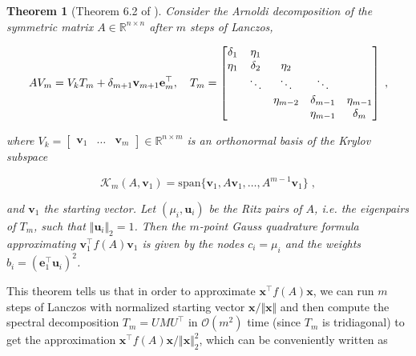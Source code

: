 \documentclass{article}
\newcommand{\vect}[1]{\boldsymbol{\mathbf{#1}}}
\newcommand{\R}{\mathbb R}
\newcommand{\norm}[1]{\Vert #1 \Vert}
\newtheorem{theorem}{Theorem}[section]
\begin{document}
\begin{theorem}[{{Theorem 6.2 of \cite{golub_matrices_2010}}}] \label{thm:lanczos_quadrature}
Consider the Arnoldi decomposition of the symmetric matrix $A \in \R^{n\times n}$ after $m$ steps of Lanczos,

\begin{equation} \label{eq:arnoldi_decomp_lanczos}
    A V_m = V_k T_m + \delta_{m+1} \vect v_{m+1} \vect e_m^\top, \quad T_m = \begin{bmatrix}
        \delta_1 & \eta_1   &              &               & \\
        \eta_1   & \delta_2 & \eta_2       &               & \\
                 & \ddots   & \ddots       & \ddots        & \\
                 &          & \eta_{m-2}   & \delta_{m-1}  & \eta_{m-1} \\
                 &          &              & \eta_{m-1}   & \delta_m
    \end{bmatrix} \;,\makeatletter
\def\algbackskip{\hskip-\ALG@thistlm}
\makeatother
\end{equation}

where $V_k = \begin{bmatrix} \vect v_1 & \dots & \vect v_m \end{bmatrix} \in\R^{n\times m}$ is an orthonormal basis of the Krylov subspace

\begin{equation*}
    \mathcal K_m(A, \vect v_1) = \text{span}\{\vect v_1, A \vect v_1, \ldots, A^{m-1} \vect v_1\} \; ,
\end{equation*}

and $\vect v_1$ the starting vector. Let $(\mu_i, \vect u_i)$ be the Ritz pairs of $A$, i.e. the eigenpairs of $T_m$, such that $\Vert \vect u_i \Vert_2 = 1$. Then the $m$-point Gauss quadrature formula approximating $\vect v_1^\top f(A) \vect v_1$ is given by the nodes $c_i = \mu_i$ and the weights $b_i = (\vect e_1^\top \vect u_i)^2$.
\end{theorem}

This theorem tells us that in order to approximate $\vect x^\top f(A) \vect x$, we can run $m$ steps of Lanczos with normalized starting vector $\vect x  / \norm{\vect x}$ and then compute the spectral decomposition $T_m = U M U^\top$ in $\mathcal O(m^2)$ time (since $T_m$ is tridiagonal) to get the approximation $\vect x^\top f(A) \vect x / \norm{\vect x}_2^2$, which can be conveniently written as
\end{document}
